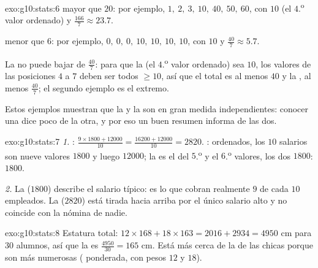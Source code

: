 \begin{solution}{exo:g10:stats:6}
 mayor que $20$: por ejemplo, $1,\ 2,\ 3,\ 10,\ 40,\ 50,\ 60$, con
 $10$ (el $4$.\textsuperscript{o} valor ordenado) y 
$\frac{166}{7} \approx 23.7$.

 menor que $6$: por ejemplo, $0,\ 0,\ 0,\ 10,\ 10,\ 10,\ 10$, con
 $10$ y  $\frac{40}{7} \approx 5.7$.

La  no puede bajar de $\frac{40}{7}$: para que la  (el
$4$.\textsuperscript{o} valor ordenado) sea $10$, los valores de las
posiciones $4$ a $7$ deben ser todos $\geq 10$, así que el total es al
menos $40$ y la , al menos $\frac{40}{7}$; el segundo ejemplo es el
extremo.

Estos ejemplos muestran que la  y la  son en gran medida
independientes: conocer una dice poco de la otra, y por eso un buen
resumen informa de las dos.
\end{solution}

\begin{solution}{exo:g10:stats:7}
\emph{1.} :
$\frac{9 \times 1800 + 12000}{10} = \frac{16200 + 12000}{10} = 2820$.
: ordenados, los $10$ salarios son nueve valores $1800$ y luego
$12000$; la  es el  del $5$.\textsuperscript{o} y el
$6$.\textsuperscript{o} valores, los dos $1800$:  $1800$.

\emph{2.} La  ($1800$) describe el salario típico: es lo que cobran
realmente $9$ de cada $10$ empleados. La  ($2820$) está tirada hacia
arriba por el único salario alto y no coincide con la nómina de nadie.
\end{solution}

\begin{solution}{exo:g10:stats:8}
Estatura total: $12 \times 168 + 18 \times 163 = 2016 + 2934 = 4950$ cm
para $30$ alumnos, así que la  es $\frac{4950}{30} = 165$ cm. Está
más cerca de la  de las chicas porque son más numerosas (
ponderada, con pesos $12$ y $18$).
\end{solution}

